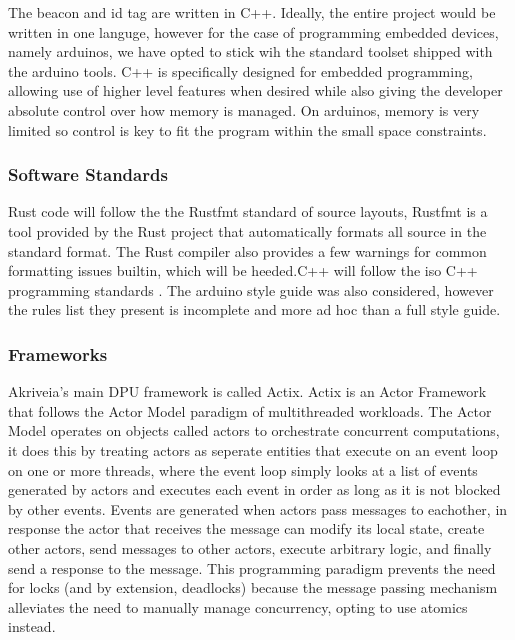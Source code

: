 \bigskip
The beacon and id tag are written in C++.
Ideally, the entire project would be written in one languge, however for the case of programming embedded devices, namely arduinos, we have opted to stick wih the standard toolset shipped with the arduino tools.
C++ is specifically designed for embedded programming, allowing use of higher level features when desired while also giving the developer absolute control over how memory is managed.
On arduinos, memory is very limited so control is key to fit the program within the small space constraints.


\medskip
\subsubsection{Software Standards}
Rust code will follow the the Rustfmt standard of source layouts, Rustfmt is a tool provided by the Rust project that automatically formats all source in the standard format. The Rust compiler also provides a few warnings for common formatting issues builtin, which will be heeded.C++ will follow the iso C++ programming standards \cite{cpp_core_guidelines}. The arduino style guide \cite{arduino_style_guide} was also considered, however the rules list they present is incomplete and more ad hoc than a full style guide.

\medskip
\subsubsection{Frameworks}
Akriveia's main DPU framework is called \Gls{Actix}. Actix is an \Gls{Actor} Framework that follows the \Gls{Actor Model} paradigm of multithreaded workloads. The Actor Model operates on objects called actors to orchestrate concurrent computations, it does this by treating actors as seperate entities that execute on an event loop on one or more threads, where the event loop simply looks at a list of events generated by actors and executes each event in order as long as it is not blocked by other events.
Events are generated when actors pass messages to eachother, in response the actor that receives the message can modify its local state, create other actors, send messages to other actors, execute arbitrary logic, and finally send a response to the message. This programming paradigm prevents the need for locks (and by extension, deadlocks) because the message passing mechanism alleviates the need to manually manage concurrency, opting to use atomics instead.


